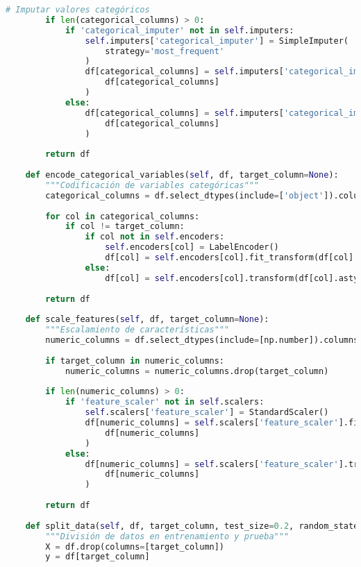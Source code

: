 \begin{lstlisting}[language=Python, caption=Módulo principal de preprocesamiento]
        # Imputar valores categóricos
        if len(categorical_columns) > 0:
            if 'categorical_imputer' not in self.imputers:
                self.imputers['categorical_imputer'] = SimpleImputer(
                    strategy='most_frequent'
                )
                df[categorical_columns] = self.imputers['categorical_imputer'].fit_transform(
                    df[categorical_columns]
                )
            else:
                df[categorical_columns] = self.imputers['categorical_imputer'].transform(
                    df[categorical_columns]
                )
        
        return df
    
    def encode_categorical_variables(self, df, target_column=None):
        """Codificación de variables categóricas"""
        categorical_columns = df.select_dtypes(include=['object']).columns
        
        for col in categorical_columns:
            if col != target_column:
                if col not in self.encoders:
                    self.encoders[col] = LabelEncoder()
                    df[col] = self.encoders[col].fit_transform(df[col].astype(str))
                else:
                    df[col] = self.encoders[col].transform(df[col].astype(str))
        
        return df
    
    def scale_features(self, df, target_column=None):
        """Escalamiento de características"""
        numeric_columns = df.select_dtypes(include=[np.number]).columns
        
        if target_column in numeric_columns:
            numeric_columns = numeric_columns.drop(target_column)
        
        if len(numeric_columns) > 0:
            if 'feature_scaler' not in self.scalers:
                self.scalers['feature_scaler'] = StandardScaler()
                df[numeric_columns] = self.scalers['feature_scaler'].fit_transform(
                    df[numeric_columns]
                )
            else:
                df[numeric_columns] = self.scalers['feature_scaler'].transform(
                    df[numeric_columns]
                )
        
        return df
    
    def split_data(self, df, target_column, test_size=0.2, random_state=42):
        """División de datos en entrenamiento y prueba"""
        X = df.drop(columns=[target_column])
        y = df[target_column]
        

\end{lstlisting}
